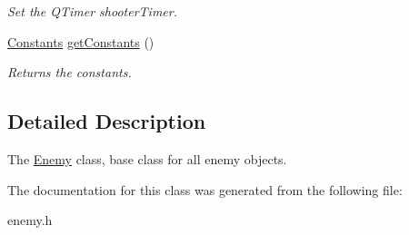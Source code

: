 \begin{DoxyCompactItemize}
\begin{DoxyCompactList}\small\item\em Set the Q\+Timer shooter\+Timer. \end{DoxyCompactList}\item 
\mbox{\label{classEnemy_af0f8e420ba12100a2069647b0992e4cf}} 
\hyperlink{structConstants}{Constants} \hyperlink{classEnemy_af0f8e420ba12100a2069647b0992e4cf}{get\+Constants} ()
\begin{DoxyCompactList}\small\item\em Returns the constants. \end{DoxyCompactList}\end{DoxyCompactItemize}


\subsection{Detailed Description}
The \hyperlink{classEnemy}{Enemy} class, base class for all enemy objects. 

The documentation for this class was generated from the following file\+:\begin{DoxyCompactItemize}
\item 
enemy.\+h\end{DoxyCompactItemize}
